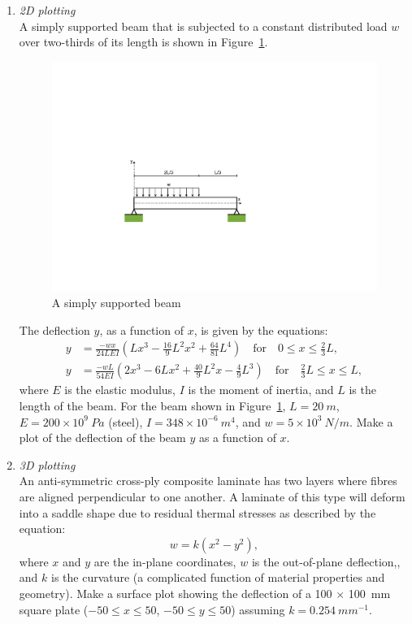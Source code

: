 \begin{enumerate}
\item \textit{2D plotting}\\
A simply supported beam that is subjected to a constant distributed load $w$ over two-thirds of its length is shown in Figure~\ref{fig:steel-beam}. 
\begin{figure}[h]
	\myfloatalign
	\includegraphics[width=0.75\linewidth]{Graphics/Additional-Ex/steel-beam}
	\caption{A simply supported beam}
	\label{fig:steel-beam}
\end{figure}
The deflection $y$, as a function of $x$, is given by the equations:
\begin{align*}
y &= \frac{-wx}{24LEI} \left( Lx^3 - \frac{16}{9}L^2x^2 + \frac{64}{81}L^4 \right) \quad \textrm{for} \quad 0 \leq x \leq \frac{2}{3}L, \\
y &= \frac{-wL}{54EI} \left( 2x^3 - 6Lx^2 + \frac{40}{9}L^2x - \frac{4}{9}L^3 \right) \quad \textrm{for} \quad \frac{2}{3}L \leq x \leq L,
\end{align*}
where $E$ is the elastic modulus, $I$ is the moment of inertia, and $L$ is the length of the beam. For the beam shown in Figure~\ref{fig:steel-beam}, $L=20~m$, $E=200\times 10^9~Pa$ (steel), $I=348 \times 10^{-6}~m^4$, and $w=5 \times 10^3~N/m$. Make a plot of the deflection of the beam $y$ as a function of $x$.

\item \textit{3D plotting}\\
An anti-symmetric cross-ply composite laminate has two layers where fibres are aligned perpendicular to one another. A laminate of this type will deform into a saddle shape due to residual thermal stresses as described by the equation:
\begin{equation*}
w = k(x^2-y^2),
\end{equation*}
where $x$ and $y$ are the in-plane coordinates, $w$ is the out-of-plane deflection,, and $k$ is the curvature (a complicated function of material properties and geometry). Make a \threed surface plot showing the deflection of a 100 $\times$ 100~mm square plate ($-50\leq x \leq 50$, $-50\leq y \leq 50$) assuming $k=0.254~mm^{-1}$.


\end{enumerate}
